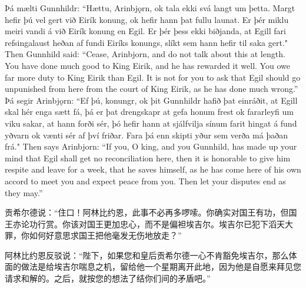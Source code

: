 \begin{paracol}{2}
    Þá mælti Gunnhildr: ``Hættu, Arinbjǫrn, ok tala ekki svá langt um þetta. Margt hefir þú vel gert við Eirík konung, ok hefir hann þat fullu launat. Er þér miklu meiri vandi á við Eirík konung en Egil. Er þér þess ekki biðjanda, at Egill fari refsingalaust heðan af fundi Eiríks konungs, slíkt sem hann hefir til saka gert."
    \switchcolumn
    Then Gunnhild said: ``Cease, Arinbjorn, and do not talk about this at length. You have done much good to King Eirik, and he has rewarded it well. You owe far more duty to King Eirik than Egil. It is not for you to ask that Egil should go unpunished from here from the court of King Eirik, as he has done much wrong.''
    \switchcolumn*
    Þá segir Arinbjǫrn: ``Ef þú, konungr, ok þit Gunnhildr hafið þat einráðit, at Egill skal hér enga sætt fá, þá er þat drengskapr at gefa honum frest ok fararleyfi um viku sakar, at hann forði sér, þó hefir hann at sjálfvilja sínum farit hingat á fund yðvarn ok vænti sér af því friðar. Fara þá enn skipti yður sem verða má þaðan frá."
    \switchcolumn
    Then says Arinbjorn: ``If you, O king, and you Gunnhild, has made up your mind that Egil shall get no reconciliation here, then it is honorable to give him respite and leave for a week, that he saves himself, as he has come here of his own accord to meet you and expect peace from you. Then let your disputes end as they may.''
\end{paracol}
\begin{translation*}{}
    贡希尔德说：“住口！阿林比约恩，此事不必再多啰嗦。你确实对国王有功，但国王亦论功行赏。你该对国王更加忠心，而不是偏袒埃吉尔。埃吉尔已犯下滔天大罪，你如何好意思求国王把他毫发无伤地放走？”

    阿林比约恩反驳说：“陛下，如果您和皇后贡希尔德一心不肯豁免埃吉尔，那么体面的做法是给埃吉尔喘息之机，留给他一个星期离开此地，因为他是自愿来拜见您请求和解的。之后，就按您的想法了结你们间的矛盾吧。”
\end{translation*}
